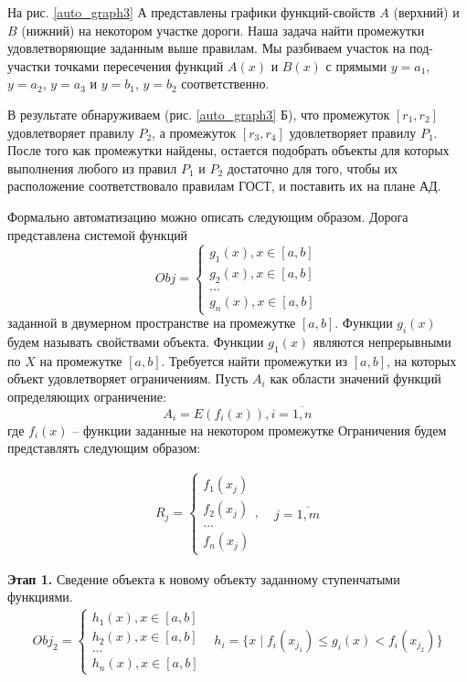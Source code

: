 На рис. \ref{auto_graph3} А представлены графики функций-свойств $A$ (верхний) и $B$ (нижний) на некотором участке дороги. Наша задача найти промежутки удовлетворяющие заданным выше правилам. Мы разбиваем участок на под-участки точками пересечения функций $A(x)$ и $B(x)$ с прямыми $y = a_1$, $y = a_2$, $y = a_3$ и $y = b_1$, $y = b_2$ соответственно. 

В результате обнаруживаем (рис. \ref{auto_graph3} Б), что промежуток $[r_1,r_2]$ удовлетворяет правилу $P_2$, а промежуток $[r_3,r_4]$ удовлетворяет правилу $P_1$. После того как промежутки найдены, остается подобрать объекты для которых выполнения любого из правил $P_1$ и $P_2$ достаточно для того, чтобы их расположение соответствовало правилам ГОСТ, и поставить их на плане АД. 

Формально автоматизацию можно описать следующим образом. Дорога представлена системой функций
$$
Obj = 
\begin{cases}
g_1(x), x \in [a, b] \\
g_2(x), x \in [a, b] \\
\dots \\
g_n(x), x \in [a, b]
\end{cases}
$$
\noindent
заданной в двумерном пространстве на промежутке $[a,b]$. Функции $g_i(x)$ будем называть свойствами объекта. Функции $g_1(x)$ являются непрерывными по $X$ на промежутке $[a,b]$. Требуется найти промежутки из $[a,b]$, на которых объект удовлетворяет ограничениям. Пусть $A_i$ как области значений функций определяющих ограничение:
$$
A_i = E(f_i(x)), i = \overline{1, n}
$$
где $f_i(x)$ -- функции заданные на некотором промежутке  Ограничения будем представлять следующим образом:

$$
\begin{aligned}
	R_j = \begin{cases}
	f_1(x_j) \\
	f_2(x_j) \\
	\dots \\
	f_n(x_j)
	\end{cases},\;
\end{aligned}
\begin{aligned}
j = \overline{1, m}
\end{aligned}
$$

\textbf{Этап 1.} Сведение объекта  к новому объекту заданному ступенчатыми функциями.
$$
\begin{aligned}
	Obj_2 = 
	\begin{cases}
		h_1(x), x \in [a, b] \\
		h_2(x), x \in [a, b] \\
		\dots \\
		h_n(x), x \in [a, b]
	\end{cases}
\end{aligned}
\begin{aligned}
h_i = \{x\;|\; f_i(x_{j_1}) \leq g_i(x) < f_i(x_{j_2}) \}
\end{aligned}
$$

